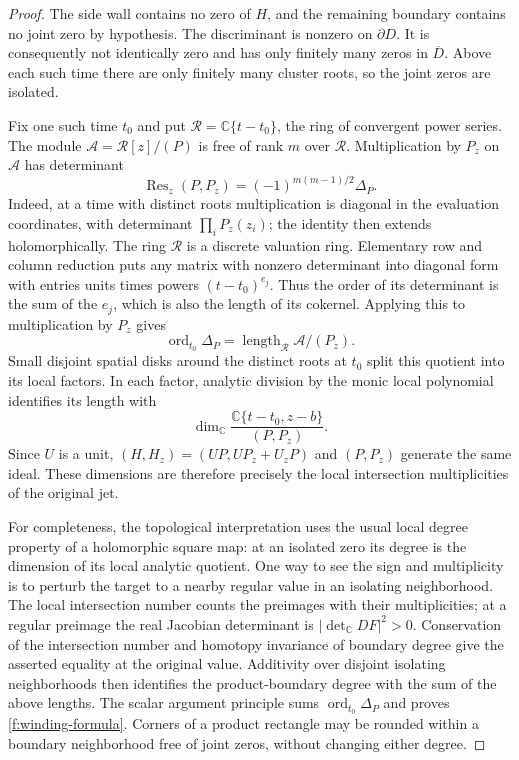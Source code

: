 \begin{proof}
The side wall contains no zero of $H$, and the remaining boundary
contains no joint zero by hypothesis.  The discriminant is nonzero
on $\partial D$.  It is consequently not identically zero and has
only finitely many zeros in $\overline D$.  Above each such time there
are only finitely many cluster roots, so the joint zeros are isolated.

Fix one such time $t_0$ and put
$\mathcal R=\mathbb C\{t-t_0\}$, the ring of convergent power series.
The module $\mathcal A=\mathcal R[z]/(P)$ is free of rank $m$ over
$\mathcal R$.  Multiplication by $P_z$ on $\mathcal A$ has determinant
\[
 \operatorname{Res}_z(P,P_z)
    =(-1)^{m(m-1)/2}\Delta_P.
\]
Indeed, at a time with distinct roots multiplication is diagonal in
the evaluation coordinates, with determinant $\prod_iP_z(z_i)$;
the identity then extends holomorphically.  The ring $\mathcal R$ is
a discrete valuation ring.  Elementary row and column reduction puts
any matrix with nonzero determinant into diagonal form with entries
units times powers $(t-t_0)^{e_j}$.  Thus the order of its determinant
is the sum of the $e_j$, which is also the length of its cokernel.
Applying this to multiplication by $P_z$ gives
\[
 \operatorname{ord}_{t_0}\Delta_P
       =\operatorname{length}_{\mathcal R}\mathcal A/(P_z).
\]
Small disjoint spatial disks around the distinct roots at $t_0$
split this quotient into its local factors.  In each factor, analytic
division by the monic local polynomial identifies its length with
\[
 \dim_{\mathbb C}
 \frac{\mathbb C\{t-t_0,z-b\}}{(P,P_z)}.
\]
Since $U$ is a unit, $(H,H_z)=(UP,UP_z+U_zP)$ and $(P,P_z)$
generate the same ideal.  These dimensions are therefore precisely
the local intersection multiplicities of the original jet.

For completeness, the topological interpretation uses the usual local
degree property of a holomorphic square map: at an isolated zero its
degree is the dimension of its local analytic quotient.  One way to
see the sign and multiplicity is to perturb the target to a nearby
regular value in an isolating neighborhood.  The local intersection
number counts the preimages with their multiplicities; at a regular
preimage the real Jacobian determinant is
$|\det_{\mathbb C}DF|^2>0$.  Conservation of the intersection number
and homotopy invariance of boundary degree give the asserted equality
at the original value.  Additivity over disjoint isolating neighborhoods
then identifies the product-boundary degree with the sum of the above
lengths.  The scalar argument principle sums
$\operatorname{ord}_{t_0}\Delta_P$ and proves
\eqref{f:winding-formula}.  Corners of a product rectangle may be
rounded within a boundary neighborhood free of joint zeros, without
changing either degree.
\end{proof}

